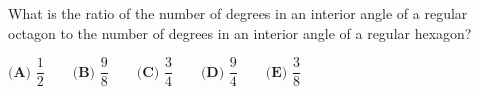 What is the ratio of the number of degrees in an interior angle of a regular octagon to the number of degrees in an interior angle of a regular hexagon?

$\textbf{(A) }\dfrac{1}{2}\qquad\textbf{(B) }\dfrac{9}{8}\qquad\textbf{(C) }\dfrac{3}{4}\qquad\textbf{(D) }\dfrac{9}{4}\qquad\textbf{(E) }\dfrac{3}{8}$
